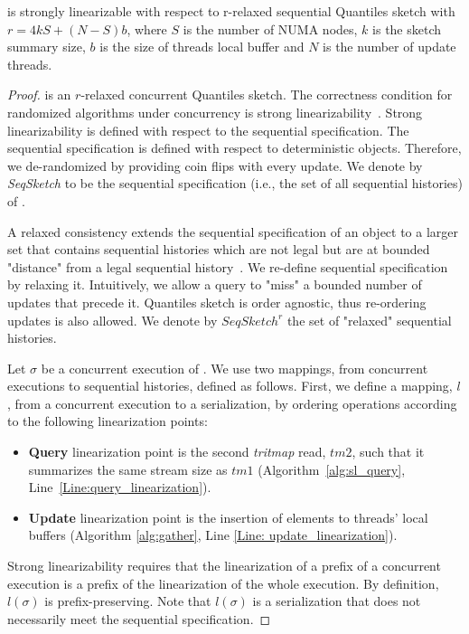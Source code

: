 \begin{lemma} \label{Lem: sl_relaxation}
\mysketch is strongly linearizable with respect to r-relaxed sequential Quantiles sketch with \(r=4kS + (N-S)b\), where $S$ is the number of NUMA nodes, $k$ is the sketch summary size, $b$ is the size of threads local buffer and $N$ is the number of update threads.
\end{lemma}
\begin{proof}
\mysketch is an $r$-relaxed concurrent Quantiles sketch. 
The correctness condition for randomized algorithms under concurrency is strong linearizability~\cite{strong_linearizability}. Strong linearizability is defined with respect to the sequential specification. The sequential specification is defined with respect to deterministic objects. Therefore, we de-randomized \mysketch by providing coin flips with every update. We denote by \emph{SeqSketch} to be the sequential specification (i.e., the set of all sequential histories) of \mysketch.


A relaxed consistency extends the sequential specification of an object to a larger set that contains sequential histories which are not legal but are at bounded "distance" from a legal sequential history~\cite{Henzinger_2013_Quantitative_Relaxation, Afek_2010_Quasi_linearizability, Rinberg_2020_fast_sketches}. We re-define \mysketch sequential specification by relaxing it. Intuitively, we allow a query to "miss" a bounded number of updates that precede it. Quantiles sketch is order agnostic, thus re-ordering updates is also allowed. We denote by $SeqSketch^r$ the set of "relaxed" sequential histories.

Let $\sigma$ be a concurrent execution of \mysketch. We use two mappings, from concurrent executions to sequential histories, defined as follows.
First, we define a mapping, $l$, from a concurrent execution to a serialization, by ordering operations according to the following linearization points:
\begin{itemize}
\item \textbf{Query} linearization point is the second \emph{tritmap} read, $tm2$, such that it summarizes the same stream size as $tm1$ (Algorithm~\ref{alg:sl_query}, Line~\ref{Line:query_linearization}).
\item \textbf{Update} linearization point is the insertion of elements to threads' local buffers (Algorithm \ref{alg:gather}, Line \ref{Line: update_linearization}).
\end{itemize}

Strong linearizability requires that the linearization of a prefix of a concurrent execution is a prefix of the linearization of the whole execution. By definition, $l(\sigma)$ is prefix-preserving. Note that $l(\sigma)$ is a serialization that does not necessarily meet the sequential specification.


\end{proof}
